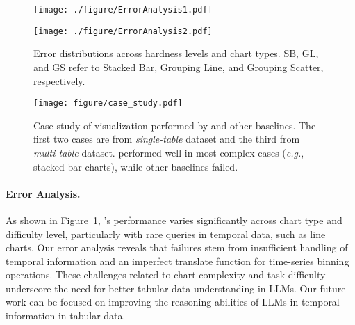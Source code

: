 \begin{figure}[!t]
    \centering
    \begin{minipage}[b]{\linewidth}
        \centering
        \texttt{[image: ./figure/ErrorAnalysis1.pdf]}
    \end{minipage}

    \begin{minipage}[b]{\linewidth}
        \centering
        \texttt{[image: ./figure/ErrorAnalysis2.pdf]}
    \end{minipage}

    \caption{Error distributions across hardness levels and chart types. SB, GL, and GS refer to Stacked Bar, Grouping Line, and Grouping Scatter, respectively.}
    \label{fig:Combined_ErrorAnalysis}
\end{figure}

\begin{figure*}[!t]
\centering
\texttt{[image: figure/case\_study.pdf]}
    \caption{Case study of visualization performed by \system and other baselines. The first two cases are from \textit{single-table} dataset and the third from \textit{multi-table} dataset. \system performed well in most complex cases (\emph{e.g.}, stacked bar charts), while other baselines failed.}
    \label{fig:case_study}
    \vspace{-1em}
\end{figure*}

\paragraph{Error Analysis.} 
As shown in Figure~\ref{fig:Combined_ErrorAnalysis}, \system's performance varies significantly across chart type and difficulty level, particularly with rare queries in temporal data, such as line charts. Our error analysis reveals that failures stem from insufficient handling of temporal information and an imperfect translate function for time-series binning operations. These challenges related to chart complexity and task difficulty underscore the need for better tabular data understanding in LLMs. Our future work can be focused on improving the reasoning abilities of LLMs in temporal information in tabular data. 
